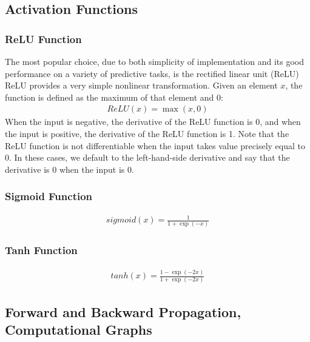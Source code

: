 \documentclass[a4paper,12pt]{article}
\theoremstyle{definition}
\begin{document}
    \subsection*{Activation Functions}
    \subsubsection*{ReLU Function}
    The most popular choice, due to both simplicity of implementation and its good performance on a variety of predictive tasks, is the rectified linear unit (ReLU) 
    ReLU provides a very simple nonlinear transformation. Given an element $x$, the function is defined as the maximum of that element and 0:
    \begin{equation*}
        \begin{aligned}
            ReLU(x) = \max(x,0)
        \end{aligned}
    \end{equation*}
    When the input is negative, the derivative of the ReLU function is 0, and when the input is positive, the derivative of the ReLU function is 1. Note that the ReLU 
    function is not differentiable when the input takes value precisely equal to 0. In these cases, we default to the left-hand-side derivative and say that the derivative
    is 0 when the input is 0.
    \subsubsection*{Sigmoid Function}
    \begin{equation*}
        \begin{aligned}
            sigmoid(x) = \frac{1}{1+\exp(-x)}
        \end{aligned}
    \end{equation*}
    \subsubsection*{Tanh Function}
    \begin{equation*}
        \begin{aligned}
            tanh(x) = \frac{1-\exp(-2x)}{1+\exp(-2x)}
        \end{aligned}
    \end{equation*}
    
    \subsection*{Forward and Backward Propagation, Computational Graphs}
\end{document}
